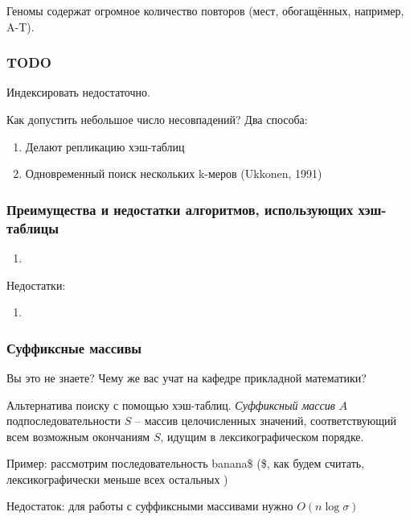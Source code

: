 \documentclass[main.tex]{subfiles}
\begin{document}
    Геномы содержат огромное количество повторов (мест, обогащённых, например,  A-T).
    \subsubsection{TODO}

    Индексировать недостаточно.

    Как допустить небольшое число несовпадений?
    Два способа:

    \begin{enumerate}[noitempsep]
        \item Делают репликацию хэш-таблиц
        \item Одновременный поиск нескольких k-меров (Ukkonen, 1991)
    \end{enumerate}

    \subsubsection{Преимущества и недостатки алгоритмов, использующих хэш-таблицы}

    \begin{enumerate}[noitemsep]
        \item
    \end{enumerate}

    Недостатки:

    \begin{enumerate}[noitemsep]
        \item
    \end{enumerate}

    \subsubsection{Суффиксные массивы}

    Вы это не знаете?
    Чему же вас учат на кафедре прикладной математики?

    Альтернатива поиску с помощью хэш-таблиц.
    \emph{Суффиксный массив} $A$ подпоследовательности $S$ -- массив целочисленных значений, соответствующий всем возможным окончаниям $S$, идущим в лексикографическом порядке.

    Пример: рассмотрим последовательность banana\$ (\$, как будем считать, лексикографически меньше всех остальных )

    Недостаток: для работы с суффиксными массивами нужно $O(n \log \sigma)$

\end{document}
